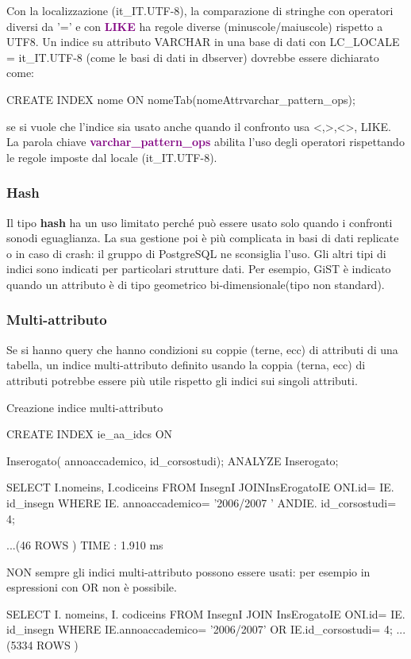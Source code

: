 Con la localizzazione (it\_IT.UTF-8), la comparazione di stringhe con operatori diversi da ’=’ e con \textcolor{purple}{\textbf{LIKE}} ha regole diverse (minuscole/maiuscole) rispetto a UTF8.
Un indice su attributo VARCHAR in una base di dati con LC\_LOCALE = it\_IT.UTF-8 (come le basi di dati in dbserver) dovrebbe essere dichiarato come:
\begin{codiceSQL}
CREATE INDEX nome ON nomeTab(nomeAttrvarchar_pattern_ops);
\end{codiceSQL}
se si vuole che l'indice sia usato anche quando il confronto usa <,>,<>, LIKE.
La parola chiave \textcolor{purple}{\textbf{varchar\_pattern\_ops}} abilita l'uso degli operatori rispettando le regole imposte dal locale (it\_IT.UTF-8).

\subsubsection{Hash}

Il tipo \textbf{hash} ha un uso limitato perché può essere usato solo quando i confronti sonodi eguaglianza.
La sua gestione poi è più complicata in basi di dati replicate o in caso di crash: il gruppo di PostgreSQL ne sconsiglia l’uso.
Gli altri tipi di indici sono indicati per particolari strutture dati. Per esempio, GiST è indicato quando un attributo è di tipo geometrico bi-dimensionale(tipo non standard).

\subsubsection{Multi-attributo}
Se si hanno query che hanno condizioni su coppie (terne, ecc) di attributi di una tabella, un indice multi-attributo definito usando la coppia (terna, ecc) di attributi potrebbe essere più utile rispetto gli indici sui singoli attributi.

Creazione indice multi-attributo
\begin{codiceSQL}
CREATE INDEX ie_aa_idcs ON

Inserogato( annoaccademico, id_corsostudi);
ANALYZE Inserogato;

SELECT I.nomeins, I.codiceins
FROM InsegnI JOINInsErogatoIE ONI.id= IE. id_insegn
WHERE IE. annoaccademico= '2006/2007 '
ANDIE. id_corsostudi= 4;

...(46 ROWS )
TIME : 1.910 ms
\end{codiceSQL}



NON sempre gli indici multi-attributo possono essere usati: per esempio in espressioni con OR non è possibile.
\begin{codiceSQL}
SELECT I. nomeins, I. codiceins
FROM InsegnI JOIN InsErogatoIE ONI.id= IE. id_insegn
WHERE IE.annoaccademico= '2006/2007' OR IE.id_corsostudi= 4;
...(5334 ROWS )  
\end{codiceSQL}


